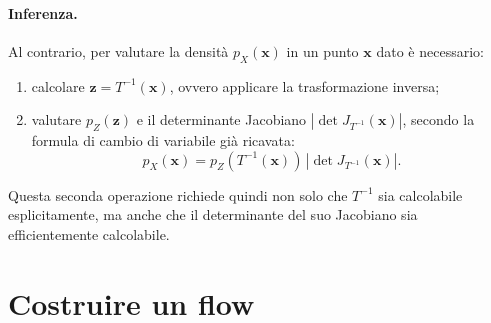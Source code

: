 \paragraph{Inferenza.} Al contrario, per valutare la densità $p_X(\mathbf{x})$ in un punto $\mathbf{x}$ dato è necessario:
\begin{enumerate}
    \item calcolare $\mathbf{z} = T^{-1}(\mathbf{x})$, ovvero applicare la trasformazione inversa;
    \item valutare $p_Z(\mathbf{z})$ e il determinante Jacobiano $|\det J_{T^{-1}}(\mathbf{x})|$, secondo la formula di cambio di variabile già ricavata:
    \begin{equation}
        p_X(\mathbf{x}) = p_Z(T^{-1}(\mathbf{x})) \, |\det J_{T^{-1}}(\mathbf{x})|.
    \end{equation}
\end{enumerate}
Questa seconda operazione richiede quindi non solo che $T^{-1}$ sia calcolabile esplicitamente, ma anche che il determinante del suo Jacobiano sia efficientemente calcolabile.

\section{Costruire un flow}
\label{sec:construction}
